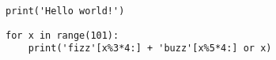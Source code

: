 \documentclass[UTF8]{ctexart}
\begin{document}
\lstinline[style = python]|print('Hello world!')|
\begin{lstlisting}[style = python]
for x in range(101):
    print('fizz'[x%3*4:] + 'buzz'[x%5*4:] or x)
\end{lstlisting}
\end{document}
